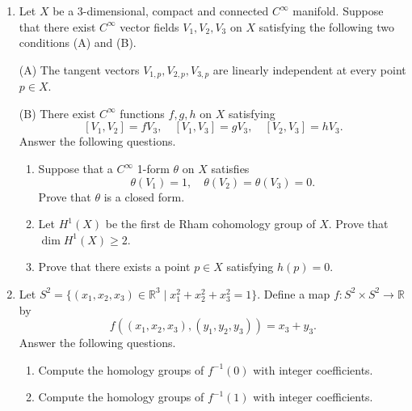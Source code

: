 \documentclass{article}
\begin{document}
\begin{enumerate}[label=\fbox{\arabic*}]
        ($*$) For every complex number $\alpha$ that satisfies $f(\alpha) = 0$, $\mathbb{Q}(\alpha)/\mathbb{Q}$ is a Galois extension of degree 6.

  \item %
        Let $X$ be a 3-dimensional, compact and connected $C^\infty$ manifold. Suppose that there exist $C^\infty$ vector fields $V_1, V_2, V_3$ on $X$ satisfying the following two conditions (A) and (B).
        
        (A) The tangent vectors $V_{1,p}, V_{2,p}, V_{3,p}$ are linearly independent at every point $p \in X$.
        
        (B) There exist $C^\infty$ functions $f, g, h$ on $X$ satisfying
        \[
          [V_1, V_2] = fV_3, \quad [V_1, V_3] = gV_3, \quad [V_2, V_3] = hV_3.
        \]
        Answer the following questions.
        \begin{enumerate}[label=(\arabic*)]
          \item Suppose that a $C^\infty$ 1-form $\theta$ on $X$ satisfies
          \[
            \theta(V_1) = 1, \quad \theta(V_2) = \theta(V_3) = 0.
          \]
          Prove that $\theta$ is a closed form.
          \item Let $H^1(X)$ be the first de Rham cohomology group of $X$. Prove that $\dim H^1(X) \ge 2$.
          \item Prove that there exists a point $p \in X$ satisfying $h(p) = 0$.
        \end{enumerate}

  \item %
        Let $S^2 = \{ (x_1, x_2, x_3) \in \mathbb{R}^3 \mid x_1^2 + x_2^2 + x_3^2 = 1 \}$. Define a map $f: S^2 \times S^2 \to \mathbb{R}$ by
        \[
          f((x_1, x_2, x_3), (y_1, y_2, y_3)) = x_3 + y_3.
        \]
        Answer the following questions.
        \begin{enumerate}[label=(\arabic*)]
          \item Compute the homology groups of $f^{-1}(0)$ with integer coefficients.
          \item Compute the homology groups of $f^{-1}(1)$ with integer coefficients.
        \end{enumerate}


\end{enumerate}
\end{document}
